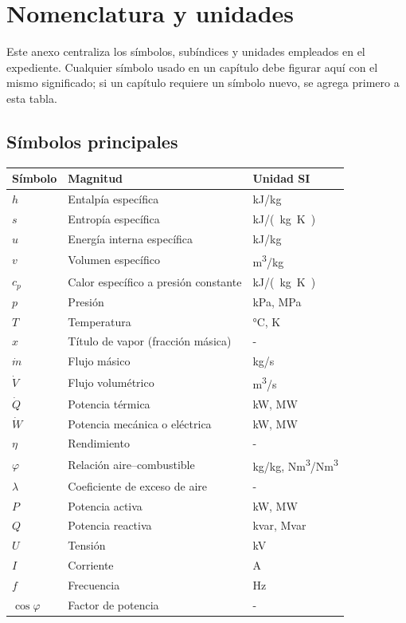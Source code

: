\chapter{Nomenclatura y unidades}
\label{anexo:nomenclatura}

Este anexo centraliza los símbolos, subíndices y unidades empleados en el
expediente. Cualquier símbolo usado en un capítulo debe figurar aquí con el mismo
significado; si un capítulo requiere un símbolo nuevo, se agrega primero a esta
tabla.

\section{Símbolos principales}

\begin{longtable}{@{}p{2.4cm}p{7.2cm}p{3.6cm}@{}}
  \toprule
  \textbf{Símbolo} & \textbf{Magnitud} & \textbf{Unidad SI} \\
  \midrule
  \endhead
  $h$        & Entalpía específica & \unit{kJ/kg} \\
  $s$        & Entropía específica & \unit{kJ/(kg.K)} \\
  $u$        & Energía interna específica & \unit{kJ/kg} \\
  $v$        & Volumen específico & \unit{m^3/kg} \\
  $c_p$      & Calor específico a presión constante & \unit{kJ/(kg.K)} \\
  $p$        & Presión & \unit{kPa}, \unit{MPa} \\
  $T$        & Temperatura & \unit{\degreeCelsius}, \unit{K} \\
  $x$        & Título de vapor (fracción másica) & \unit{-} \\
  $\dot m$   & Flujo másico & \unit{kg/s} \\
  $\dot V$   & Flujo volumétrico & \unit{m^3/s} \\
  $\dot Q$   & Potencia térmica & \unit{kW}, \unit{MW} \\
  $\dot W$   & Potencia mecánica o eléctrica & \unit{kW}, \unit{MW} \\
  $\eta$     & Rendimiento & \unit{-} \\
  $\varphi$  & Relación aire--combustible & \unit{kg/kg}, \unit{Nm^3/Nm^3} \\
  $\lambda$  & Coeficiente de exceso de aire & \unit{-} \\
  $P$        & Potencia activa & \unit{kW}, \unit{MW} \\
  $Q$        & Potencia reactiva & \unit{kvar}, \unit{Mvar} \\
  $U$        & Tensión & \unit{kV} \\
  $I$        & Corriente & \unit{A} \\
  $f$        & Frecuencia & \unit{Hz} \\
  $\cos\varphi$ & Factor de potencia & \unit{-} \\
  \bottomrule
\end{longtable}

